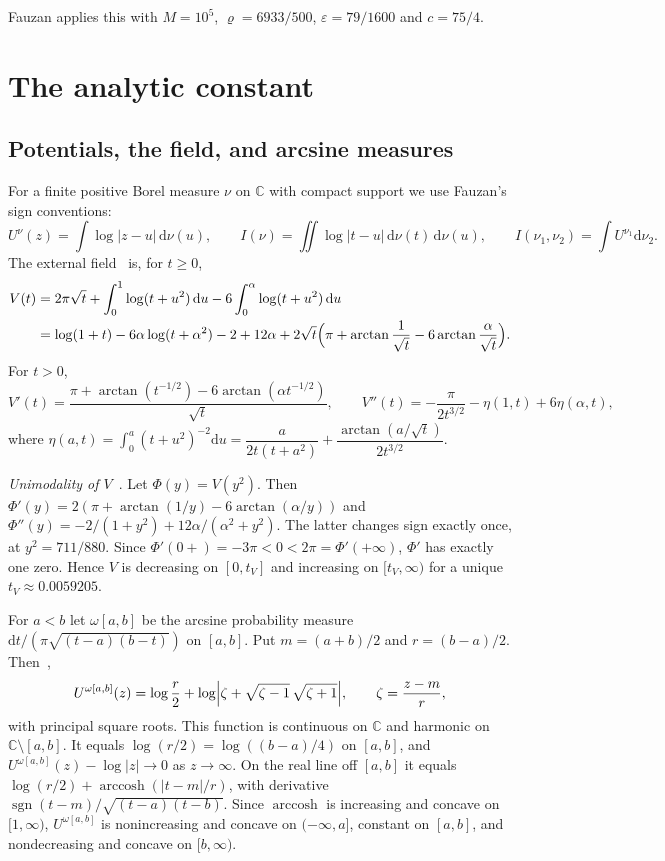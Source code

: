 \documentclass[11pt]{article}
\theoremstyle{remark}
\newcommand{\C}{\mathbb{C}}
\newcommand{\dd}{\mathrm{d}}
\DeclareMathOperator{\sgn}{sgn}
\DeclareMathOperator{\arccosh}{arccosh}
\begin{document}
Fauzan applies this with $M=10^5$, $\varrho=6933/500$, $\varepsilon=79/1600$ and $c=75/4$.

\section{The analytic constant}\label{sec:analytic}

\subsection{Potentials, the field, and arcsine measures}\label{sec:potentials}

For a finite positive Borel measure $\nu$ on $\C$ with compact support we use Fauzan's sign conventions:
\[
U^\nu(z)=\int\log|z-u|\,\dd\nu(u),\qquad I(\nu)=\iint\log|t-u|\,\dd\nu(t)\,\dd\nu(u),\qquad I(\nu_1,\nu_2)=\int U^{\nu_1}\dd\nu_2 .
\]
The external field~\cite[(6.1), (A.5)]{F} is, for $t\ge0$,
\begin{align}
V(t)&=2\pi\sqrt t+\int_0^1\log(t+u^2)\,\dd u-6\int_0^\alpha\log(t+u^2)\,\dd u\label{eq:V}\\
&=\log(1+t)-6\alpha\log(t+\alpha^2)-2+12\alpha+2\sqrt t\Bigl(\pi+\arctan\frac1{\sqrt t}-6\arctan\frac{\alpha}{\sqrt t}\Bigr).\notag
\end{align}
For $t>0$,
\begin{equation}\label{eq:Vder}
V'(t)=\frac{\pi+\arctan(t^{-1/2})-6\arctan(\alpha t^{-1/2})}{\sqrt t},\qquad
V''(t)=-\frac{\pi}{2t^{3/2}}-\eta(1,t)+6\eta(\alpha,t),
\end{equation}
where $\eta(a,t)=\int_0^a(t+u^2)^{-2}\dd u=\dfrac{a}{2t(t+a^2)}+\dfrac{\arctan(a/\sqrt t)}{2t^{3/2}}$.

\emph{Unimodality of $V$}~\cite[App.~A.3]{F}. Let $\Phi(y)=V(y^2)$. Then $\Phi'(y)=2(\pi+\arctan(1/y)-6\arctan(\alpha/y))$ and $\Phi''(y)=-2/(1+y^2)+12\alpha/(\alpha^2+y^2)$. The latter changes sign exactly once, at $y^2=711/880$. Since $\Phi'(0+)=-3\pi<0<2\pi=\Phi'(+\infty)$, $\Phi'$ has exactly one zero. Hence $V$ is decreasing on $[0,t_V]$ and increasing on $[t_V,\infty)$ for a unique $t_V\approx0.0059205$.

For $a<b$ let $\omega[a,b]$ be the arcsine probability measure $\dd t/(\pi\sqrt{(t-a)(b-t)})$ on $[a,b]$. Put $m=(a+b)/2$ and $r=(b-a)/2$. Then~\cite[(A.1)]{F},~\cite[Ex.~1.11]{Sa}
\begin{equation}\label{eq:arcpot}
U^{\omega[a,b]}(z)=\log\frac r2+\log\Bigl|\zeta+\sqrt{\zeta-1}\,\sqrt{\zeta+1}\Bigr|,\qquad\zeta=\frac{z-m}{r},
\end{equation}
with principal square roots. This function is continuous on $\C$ and harmonic on $\C\setminus[a,b]$. It equals $\log(r/2)=\log((b-a)/4)$ on $[a,b]$, and $U^{\omega[a,b]}(z)-\log|z|\to0$ as $z\to\infty$. On the real line off $[a,b]$ it equals $\log(r/2)+\arccosh(|t-m|/r)$, with derivative $\sgn(t-m)/\sqrt{(t-a)(t-b)}$. Since $\arccosh$ is increasing and concave on $[1,\infty)$, $U^{\omega[a,b]}$ is nonincreasing and concave on $(-\infty,a]$, constant on $[a,b]$, and nondecreasing and concave on $[b,\infty)$.
\end{document}
